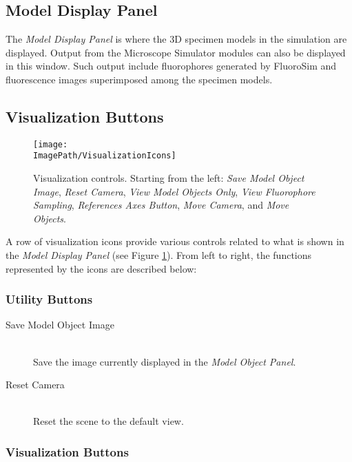 \documentclass[11pt,titlepage,twoside]{article}
\begin{document}
\subsection{Model Display Panel}

The \emph{Model Display Panel} is where the 3D specimen models in the simulation are displayed. Output from the Microscope Simulator modules can also be displayed in this window. Such output include fluorophores generated by FluoroSim and fluorescence images superimposed among the specimen models.

\subsection{Visualization Buttons}

\begin{figure}[htbp] %
   \centering
   \texttt{[image: \\ImagePath/VisualizationIcons]} 
   \caption{Visualization controls. Starting from the left: \emph{Save Model Object Image}, \emph{Reset Camera}, \emph{View Model Objects Only}, \emph{View Fluorophore Sampling}, \emph{References Axes Button}, \emph{Move Camera}, and \emph{Move Objects}.}
   \label{fig:VisualizationControls}
\end{figure}

A row of visualization icons provide various controls related to what is shown in the \emph{Model Display Panel} (see Figure \ref{fig:VisualizationControls}). From left to right, the functions represented by the icons are described below:

\subsubsection{Utility Buttons}

\begin{description}

  \item[Save Model Object Image] \hfill \\
  Save the image currently displayed in the \emph{Model Object Panel}.
  
  \item[Reset Camera] \hfill \\
  Reset the scene to the default view.
  
\end{description}

\subsubsection{Visualization Buttons}
\end{document}
